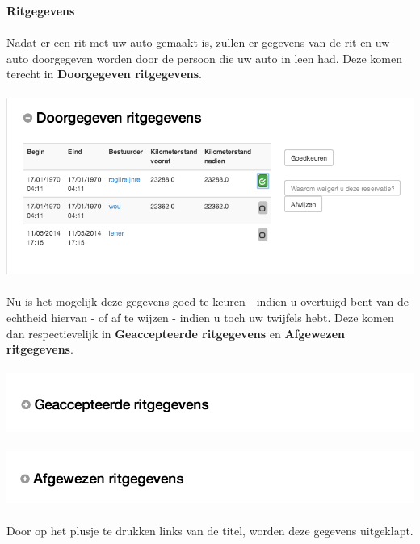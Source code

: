 \documentclass[11pt,a4paper,oneside]{article}
\begin{document}
{\large{\textbf{Ritgegevens}}} \\\\
Nadat er een rit met uw auto gemaakt is, zullen er gegevens van de rit en uw auto doorgegeven worden door de persoon die uw auto in leen had. Deze komen terecht in \textbf{Doorgegeven ritgegevens}. \\\\


\includegraphics[scale=0.75]{img/doorgegevenritgegevens} \\\\
Nu is het mogelijk deze gegevens goed te keuren - indien u overtuigd bent van de echtheid hiervan - of af te wijzen - indien u toch uw twijfels hebt. Deze komen dan respectievelijk in \textbf{Geaccepteerde ritgegevens} en \textbf{Afgewezen ritgegevens}. \\\\
\includegraphics[scale=0.75]{img/geaccepteerderitgegevens} \\\\
\includegraphics[scale=0.75]{img/afgewezenritgegevens} \\\\
Door op het plusje te drukken links van de titel, worden deze gegevens uitgeklapt.\\\\
\end{document}
